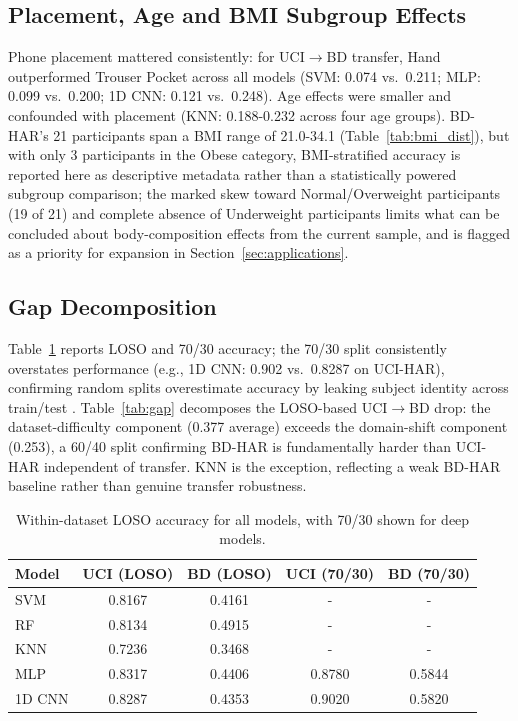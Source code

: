\documentclass[conference]{IEEEtran}
\begin{document}
\subsection{Placement, Age and BMI Subgroup Effects}
Phone placement mattered consistently: for UCI$\rightarrow$BD
transfer, Hand outperformed Trouser Pocket across all models (SVM:
0.074 vs.\ 0.211; MLP: 0.099 vs.\ 0.200; 1D CNN: 0.121 vs.\ 0.248). Age
effects were smaller and confounded with placement (KNN: 0.188-0.232
across four age groups). BD-HAR's 21 participants span a BMI range of
21.0-34.1 (Table~\ref{tab:bmi_dist}), but with only 3 participants in
the Obese category, BMI-stratified accuracy is reported here as
descriptive metadata rather than a statistically powered subgroup
comparison; the marked skew toward Normal/Overweight participants
(19 of 21) and complete absence of Underweight participants limits
what can be concluded about body-composition effects from the current
sample, and is flagged as a priority for expansion in
Section~\ref{sec:applications}.

\subsection{Gap Decomposition}
\label{subsec:loso_gap}

Table~\ref{tab:split_compare} reports LOSO and 70/30 accuracy; the
70/30 split consistently overstates performance (e.g., 1D CNN: 0.902 vs.\
0.8287 on UCI-HAR), confirming random splits overestimate accuracy by
leaking subject identity across train/test
\cite{tello_too_2023, pang_stacked_2022}. Table~\ref{tab:gap}
decomposes the LOSO-based UCI$\rightarrow$BD drop: the
dataset-difficulty component (0.377 average) exceeds the domain-shift
component (0.253), a 60/40 split confirming BD-HAR is fundamentally
harder than UCI-HAR independent of transfer. KNN is the exception, reflecting a weak BD-HAR baseline rather than genuine transfer robustness.

\begin{table}[!t]
\centering
\footnotesize
\setlength{\tabcolsep}{4pt}
\caption{Within-dataset LOSO accuracy for all models, with 70/30
shown for deep models.}
\label{tab:split_compare}
\begin{tabular}{lcccc}
\hline
Model & UCI (LOSO) & BD (LOSO) & UCI (70/30) & BD (70/30) \\
\hline
SVM & 0.8167 & 0.4161 & - & - \\
RF & 0.8134 & 0.4915 & - & - \\
KNN & 0.7236 & 0.3468 & - & - \\
MLP & 0.8317 & 0.4406 & 0.8780 & 0.5844 \\
1D CNN & 0.8287 & 0.4353 & 0.9020 & 0.5820 \\
\hline
\end{tabular}
\end{table}
\end{document}
